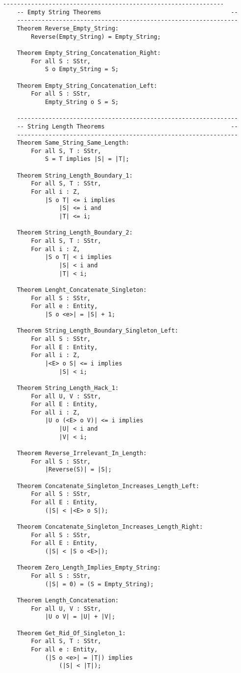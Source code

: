 \begin{lstlisting}[language=resolve]
	---------------------------------------------------------------
	-- Empty String Theorems                                     --
	---------------------------------------------------------------
	Theorem Reverse_Empty_String:
		Reverse(Empty_String) = Empty_String;

	Theorem Empty_String_Concatenation_Right:
		For all S : SStr,
			S o Empty_String = S;

	Theorem Empty_String_Concatenation_Left:
		For all S : SStr,
			Empty_String o S = S;

	---------------------------------------------------------------
	-- String Length Theorems                                    --
	---------------------------------------------------------------
	Theorem Same_String_Same_Length:
		For all S, T : SStr,
			S = T implies |S| = |T|;

	Theorem String_Length_Boundary_1:
		For all S, T : SStr,
		For all i : Z,
			|S o T| <= i implies
				|S| <= i and
				|T| <= i;

	Theorem String_Length_Boundary_2:
		For all S, T : SStr,
		For all i : Z,
			|S o T| < i implies
				|S| < i and
				|T| < i;

	Theorem Lenght_Concatenate_Singleton:
		For all S : SStr,
		For all e : Entity,
			|S o <e>| = |S| + 1;

	Theorem String_Length_Boundary_Singleton_Left:
		For all S : SStr,
		For all E : Entity,
		For all i : Z,
			|<E> o S| <= i implies
				|S| < i;

	Theorem String_Length_Hack_1:
		For all U, V : SStr,
		For all E : Entity,
		For all i : Z,
			|U o (<E> o V)| <= i implies
				|U| < i and
				|V| < i;

	Theorem Reverse_Irrelevant_In_Length:
		For all S : SStr,
			|Reverse(S)| = |S|;

	Theorem Concatenate_Singleton_Increases_Length_Left:
		For all S : SStr,
		For all E : Entity,
			(|S| < |<E> o S|);

	Theorem Concatenate_Singleton_Increases_Length_Right:
		For all S : SStr,
		For all E : Entity,
			(|S| < |S o <E>|);

	Theorem Zero_Length_Implies_Empty_String:
		For all S : SStr,
			(|S| = 0) = (S = Empty_String);

	Theorem Length_Concatenation:
		For all U, V : SStr,
			|U o V| = |U| + |V|;

	Theorem Get_Rid_Of_Singleton_1:
		For all S, T : SStr,
		For all e : Entity,
			(|S o <e>| = |T|) implies
				(|S| < |T|);


\end{lstlisting}
